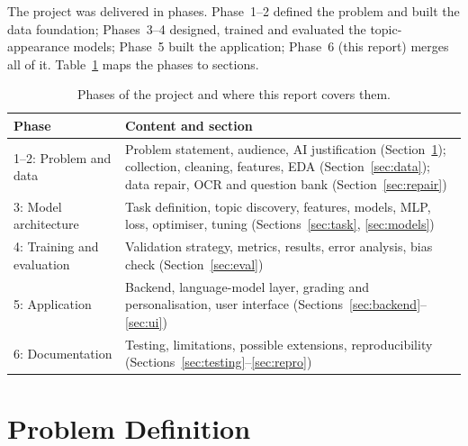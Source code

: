 \documentclass[11pt,a4paper]{article}
\begin{document}
The project was delivered in phases. Phase~1--2 defined the problem and built the data foundation; Phases~3--4 designed,
trained and evaluated the topic-appearance models; Phase~5 built the application; Phase~6 (this report) merges all of it.
Table~\ref{tab:phases} maps the phases to sections.

\begin{table}[!htb]
\centering
\small
\begin{tabular}{p{4.6cm}p{10.4cm}}
\toprule
Phase & Content and section \\
\midrule
1--2: Problem and data & Problem statement, audience, AI justification (Section~\ref{sec:problem}); collection, cleaning, features, EDA (Section~\ref{sec:data}); data repair, OCR and question bank (Section~\ref{sec:repair}) \\
3: Model architecture & Task definition, topic discovery, features, models, MLP, loss, optimiser, tuning (Sections~\ref{sec:task}, \ref{sec:models}) \\
4: Training and evaluation & Validation strategy, metrics, results, error analysis, bias check (Section~\ref{sec:eval}) \\
5: Application & Backend, language-model layer, grading and personalisation, user interface (Sections~\ref{sec:backend}--\ref{sec:ui}) \\
6: Documentation & Testing, limitations, possible extensions, reproducibility (Sections~\ref{sec:testing}--\ref{sec:repro}) \\
\bottomrule
\end{tabular}
\caption{Phases of the project and where this report covers them.}
\label{tab:phases}
\end{table}

\section{Problem Definition}
\label{sec:problem}
\end{document}

